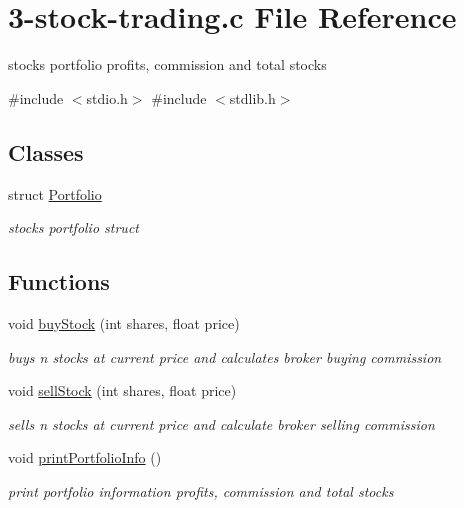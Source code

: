 \hypertarget{3-stock-trading_8c}{}\section{3-\/stock-\/trading.c File Reference}
\label{3-stock-trading_8c}


stock\textquotesingle{}s portfolio profits, commission and total stocks  


{\ttfamily \#include $<$stdio.\+h$>$}\newline
{\ttfamily \#include $<$stdlib.\+h$>$}\newline
\subsection*{Classes}
\begin{DoxyCompactItemize}
\item 
struct \mbox{\hyperlink{structPortfolio}{Portfolio}}
\begin{DoxyCompactList}\small\item\em stock\textquotesingle{}s portfolio struct \end{DoxyCompactList}\end{DoxyCompactItemize}
\subsection*{Functions}
\begin{DoxyCompactItemize}
\item 
void \mbox{\hyperlink{3-stock-trading_8c_a0ad5bbbc852c2a958c530e2a37db54a5}{buy\+Stock}} (int shares, float price)
\begin{DoxyCompactList}\small\item\em buys n stocks at current price and calculates broker buying commission \end{DoxyCompactList}\item 
void \mbox{\hyperlink{3-stock-trading_8c_ac8a01919e783f59209e9af0215300601}{sell\+Stock}} (int shares, float price)
\begin{DoxyCompactList}\small\item\em sells n stocks at current price and calculate broker selling commission \end{DoxyCompactList}\item 
\mbox{\label{3-stock-trading_8c_aecc92c55a343408ff9fc7041fc506a6a}} 
void \mbox{\hyperlink{3-stock-trading_8c_aecc92c55a343408ff9fc7041fc506a6a}{print\+Portfolio\+Info}} ()
\begin{DoxyCompactList}\small\item\em print portfolio information profits, commission and total stocks \end{DoxyCompactList}\end{DoxyCompactItemize}
